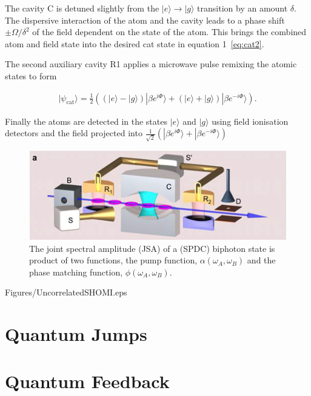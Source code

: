 \documentclass[aps,prl,twocolumn,amsmath,amssymb]{revtex4}
\begin{document}
The cavity C is detuned slightly from the $|e\rangle \rightarrow |g\rangle$ transition by an amount $\delta$.  The dispersive interaction of the atom and the cavity leads to a phase shift $\pm\Omega/\delta^2$ of the field dependent on the state of the atom. This brings the combined atom and field state into the desired cat state in equation 1~\ref{eq:cat2}.

The second auxiliary cavity R1 applies a microwave pulse %
remixing the atomic states to form 

\begin{align}
|\psi_{\mathrm{cat}}\rangle = \frac{1}{2} ((|e\rangle-|g\rangle)|\beta e^{i\Phi}\rangle+(|e\rangle+|g\rangle)|\beta e^{-i\Phi}\rangle)
\label{eq:cat3}.
\end{align}

Finally the atoms are detected in the states $|e\rangle$ and $|g\rangle$ using field ionisation detectors and the field projected into  $\frac{1}{\sqrt{2}} (|\beta e^{i\Phi}\rangle+|\beta e^{-i\Phi}\rangle)$

\begin{figure}
  \centering
  \includegraphics[width=.8\linewidth]{Figures/fig_ramsey_interf.png}
\caption{The joint spectral amplitude (JSA) of a (SPDC) biphoton state is product of two functions, the pump function, $\alpha(\omega_A,\omega_B)$ and the phase matching function, $\phi(\omega_A,\omega_B)$.}
\label{fig:Setup}
\end{figure}
Figures/UncorrelatedSHOMI.eps


\section{\label{sec:level1}Quantum Jumps}

\section{\label{sec:level1}Quantum Feedback}







\end{document}
